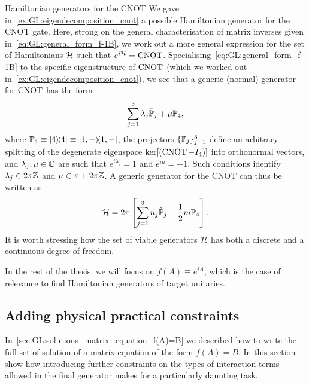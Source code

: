 \begin{examplebox}[label={ex:GL:cnot_generator_decomposition}]{Hamiltonian generators for the CNOT}
We gave in~\cref{ex:GL:eigendecomposition_cnot} a possible Hamiltonian generator for the CNOT gate.
Here, strong on the general characterisation of matrix inverses given in~\cref{eq:GL:general_form_f-1B}, we work out a more general expression for the set of Hamiltonians ${\mathcal{H}}$ such that $e^{i{\mathcal{H}}}=\operatorname{CNOT}$.
Specialising~\cref{eq:GL:general_form_f-1B} to the specific eigenstructure of $\operatorname{CNOT}$ (which we worked out in~\cref{ex:GL:eigendecomposition_cnot}), we see that a generic (normal) generator for $\operatorname{CNOT}$ has the form
\begin{equation}
    \sum_{j=1}^3 \lambda_j \tilde{{\mathbb{P}}}_j + \mu{\mathbb{P}}_4,
\end{equation}
where
${\mathbb{P}}_4\equiv\ketbra 4\equiv\ketbra{1,-}$, the projectors 
$\{\tilde{{\mathbb{P}}}_j\}_{j=1}^3$ define an arbitrary splitting of the degenerate eigenspace $\ker[(\operatorname{CNOT}-I_4)]$ into orthonormal vectors, and $\lambda_j,\mu\in{\mathbb{C}}$ are such that $e^{i\lambda_j}=1$ and $e^{i\mu}=-1$.
Such conditions identify $\lambda_j\in2\pi{\mathbb{Z}}$ and $\mu\in\pi + 2\pi{\mathbb{Z}}$.
A generic generator for the CNOT can thus be written as
\begin{equation}
    {\mathcal{H}} =
    2\pi\left[
    \sum_{j=1}^3 n_j \tilde{{\mathbb{P}}}_j +
    \frac{1}{2} m{\mathbb{P}}_4
    \right].
\end{equation}
It is worth stressing how the set of viable generators ${\mathcal{H}}$ has both a discrete and a continuous degree of freedom.
\end{examplebox}

In the rest of the thesis, we will focus on $f(A)\equiv e^{iA}$, which is the case of relevance to find Hamiltonian generators of target unitaries.

\subsection{Adding physical practical constraints}
\label{sec:GL:constraints_on_interaction_pars}

In~\cref{sec:GL:solutions_matrix_equation_f(A)=B} we described how to write the full set of solution of a matrix equation of the form $f(A)=B$.
In this section show how introducing further constraints on the types of interaction terms allowed in the final generator makes for a particularly daunting task.

